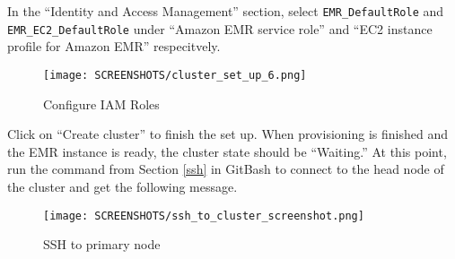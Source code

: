 \documentclass[11pt]{article}
\begin{document}
In the ``Identity and Access Management'' section, select \texttt{EMR\_DefaultRole} and \texttt{EMR\_EC2\_DefaultRole} under ``Amazon EMR service role'' and ``EC2 instance profile for Amazon EMR'' respecitvely.

\begin{figure}[H]
  \centering
  \texttt{[image: SCREENSHOTS/cluster\_set\_up\_6.png]}
  \caption{Configure IAM Roles}
  \label{fig:cluster-setup-6}
\end{figure}


Click on ``Create cluster'' to finish the set up. When provisioning is finished and the EMR instance is ready, the cluster state should be ``Waiting.'' At this point, run the command from Section \ref{ssh} in GitBash to connect to the head node of the cluster and get the following message.

\begin{figure}[H]
  \centering
  \texttt{[image: SCREENSHOTS/ssh\_to\_cluster\_screenshot.png]}
  \caption{SSH to primary node}
  \label{fig:ssh-primary}
\end{figure}
\end{document}
